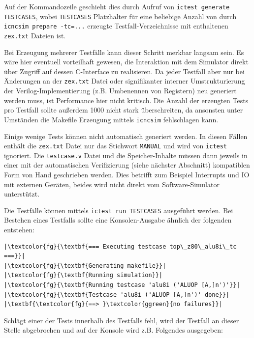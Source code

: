 \documentclass[ngerman, cd=lightcolor]{tudscrreprt}
\begin{document}
Auf der Kommandozeile geschieht dies durch Aufruf von \texttt{ictest generate
TESTCASES}, wobei \texttt{TESTCASES} Platzhalter für eine beliebige Anzahl von
durch \texttt{icncsim prepare -tc=...} erzeugte Testfall-Verzeichnisse mit
enthaltenen \texttt{zex.txt} Dateien ist.

Bei Erzeugung mehrerer Testfälle kann dieser Schritt merkbar langsam sein.  Es
wäre hier eventuell vorteilhaft gewesen, die Interaktion mit dem Simulator
direkt über Zugriff auf dessen C-Interface zu realisieren. Da jeder Testfall
aber nur bei Änderungen an der \texttt{zex.txt} Datei oder signifikanter
interner Umstrukturierung der Verilog-Implementierung (z.B. Umbenennen von
Registern) neu generiert werden muss, ist Performance hier nicht kritisch.
Die Anzahl der erzeugten Tests pro Testfall sollte außerdem 1000 nicht stark
überschreiten, da ansonsten unter Umständen die Makefile Erzeugung mittels
\texttt{icncsim} fehlschlagen kann.

Einige wenige Tests können nicht automatisch generiert werden. In diesen Fällen
enthält die \texttt{zex.txt} Datei nur das Stichwort \texttt{MANUAL} und wird
von \texttt{ictest} ignoriert. Die \texttt{testcase.v} Datei und die
Speicher-Inhalte müssen dann jeweils in einer mit der automatischen
Verifizierung (siehe nächster Abschnitt) kompatiblen Form von Hand geschrieben
werden. Dies betrifft zum Beispiel Interrupts und IO mit externen Geräten,
beides wird nicht direkt vom Software-Simulator unterstützt.

Die Testfälle können mittels \texttt{ictest run TESTCASES} ausgeführt
werden. Bei Bestehen eines Testfalls sollte eine Konsolen-Ausgabe
ähnlich der folgenden entstehen:


\begin{verbatim}
|\textcolor{fg}{\textbf{=== Executing testcase top\_z80\_alu8i\_tc ===}}|
|\textcolor{fg}{\textbf{Generating makefile}}|
|\textcolor{fg}{\textbf{Running simulation}}|
|\textcolor{fg}{\textbf{Running testcase 'alu8i ('ALUOP [A,]n')'}}|
|\textcolor{fg}{\textbf{Testcase 'alu8i ('ALUOP [A,]n')' done}}|
|\textbf{\textcolor{fg}{==> }\textcolor{ggreen}{no failures}}|
\end{verbatim}

\noindent
Schlägt einer der Tests innerhalb des Testfalls fehl, wird der Testfall an
dieser Stelle abgebrochen und auf der Konsole wird z.B. Folgendes
ausgegeben:
\end{document}
